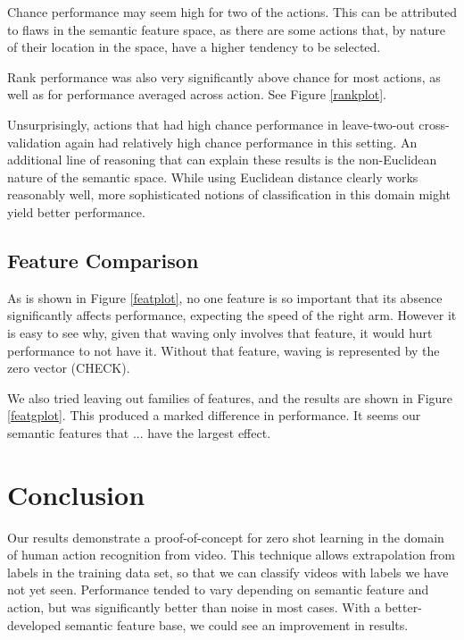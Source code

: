 \documentclass{article}
\begin{document}
Chance performance may seem high for two of the actions. This can be attributed to flaws in the semantic feature space, as there are some actions that, by nature of their location in the space, have a higher tendency to be selected.

Rank performance was also very significantly above chance for most actions, as well as for performance averaged across action. See Figure \ref{rankplot}. 

Unsurprisingly, actions that had high chance performance in leave-two-out cross-validation again had relatively high chance performance in this setting. An additional line of reasoning that can explain these results is the non-Euclidean nature of the semantic space. While using Euclidean distance clearly works reasonably well, more sophisticated notions of classification in this domain might yield better performance.

\subsection{Feature Comparison}

As is shown in Figure \ref{featplot}, no one feature is so important that its absence significantly affects performance, expecting the speed of the right arm.  However it is easy to see why, given that waving only involves that feature, it would hurt performance to not have it. Without that feature, waving is represented by the zero vector (CHECK).

We also tried leaving out families of features, and the results are shown in Figure \ref{featgplot}.  This produced a marked difference in performance. It seems our semantic features that ... have the largest effect.



\section{Conclusion}
Our results demonstrate a proof-of-concept for zero shot learning in the domain of human action recognition from video. This technique allows extrapolation from labels in the training data set, so that we can classify videos with labels we have not yet seen.  Performance tended to vary depending on semantic feature and action, but was significantly better than noise in most cases. With a better-developed semantic feature base, we could see an improvement in results.



\end{document}
